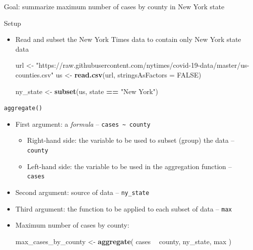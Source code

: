 \documentclass[]{book}
\newenvironment{Shaded}{\begin{snugshade}}{\end{snugshade}}
\newcommand{\DataTypeTok}[1]{\textcolor[rgb]{0.13,0.29,0.53}{#1}}
\newcommand{\KeywordTok}[1]{\textcolor[rgb]{0.13,0.29,0.53}{\textbf{#1}}}
\newcommand{\NormalTok}[1]{#1}
\newcommand{\OperatorTok}[1]{\textcolor[rgb]{0.81,0.36,0.00}{\textbf{#1}}}
\newcommand{\OtherTok}[1]{\textcolor[rgb]{0.56,0.35,0.01}{#1}}
\newcommand{\StringTok}[1]{\textcolor[rgb]{0.31,0.60,0.02}{#1}}
\begin{document}
Goal: summarize maximum number of cases by county in New York state

Setup

\begin{itemize}
\item
  Read and subset the New York Times data to contain only New York state data

\begin{Shaded}
\begin{Highlighting}[]
\NormalTok{url <-}\StringTok{ "https://raw.githubusercontent.com/nytimes/covid-19-data/master/us-counties.csv"}
\NormalTok{us <-}\StringTok{ }\KeywordTok{read.csv}\NormalTok{(url, }\DataTypeTok{stringsAsFactors =} \OtherTok{FALSE}\NormalTok{)}
\end{Highlighting}
\end{Shaded}

\begin{Shaded}
\begin{Highlighting}[]
\NormalTok{ny_state <-}\StringTok{ }\KeywordTok{subset}\NormalTok{(us, state }\OperatorTok{==}\StringTok{ "New York"}\NormalTok{)}
\end{Highlighting}
\end{Shaded}
\end{itemize}

\texttt{aggregate()}

\begin{itemize}
\item
  First argument: a \emph{formula} -- \texttt{cases\ \textasciitilde{}\ county}

  \begin{itemize}
  \item
    Right-hand side: the variable to be used to subset (group) the data -- \texttt{county}
  \item
    Left-hand side: the variable to be used in the aggregation function -- \texttt{cases}
  \end{itemize}
\item
  Second argument: source of data -- \texttt{ny\_state}
\item
  Third argument: the function to be applied to each subset of data -- \texttt{max}
\item
  Maximum number of cases by county:

\begin{Shaded}
\begin{Highlighting}[]
\NormalTok{max_cases_by_county <-}\StringTok{ }\KeywordTok{aggregate}\NormalTok{( cases }\OperatorTok{~}\StringTok{ }\NormalTok{county, ny_state, max )}
\end{Highlighting}
\end{Shaded}
\end{itemize}
\end{document}
